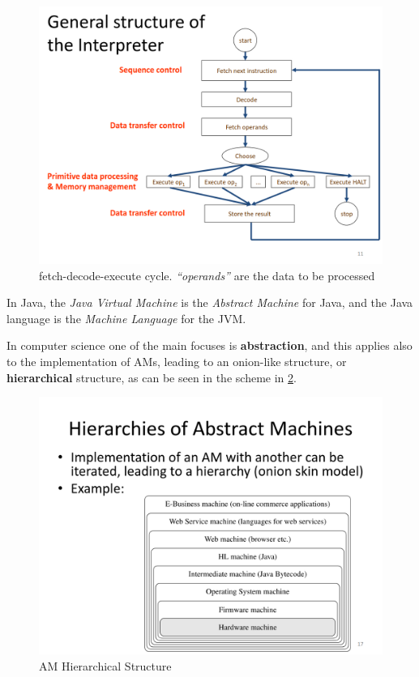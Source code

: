 \begin{figure}[htbp]
    \centering
    \includegraphics{images/interpreter_structure.png}
    \caption{fetch-decode-execute cycle. \textit{``operands''} are the data to be processed} 
    \label{fig:interpreter_structure}
\end{figure}

In Java, the \textit{Java Virtual Machine} is the \textit{Abstract Machine} for Java, and the Java language is the \textit{Machine Language} for the JVM.


In computer science one of the main focuses is \textbf{abstraction}, and this applies also to the implementation of AMs, leading to an onion-like structure, or \textbf{hierarchical} structure,
as can be seen in the scheme in \ref{fig:machines_hierarchy}.

\begin{figure}[htbp]
    \centering
    \includegraphics{images/machines_hierarchy.png}
    \caption{AM Hierarchical Structure}
    \label{fig:machines_hierarchy}
\end{figure}

